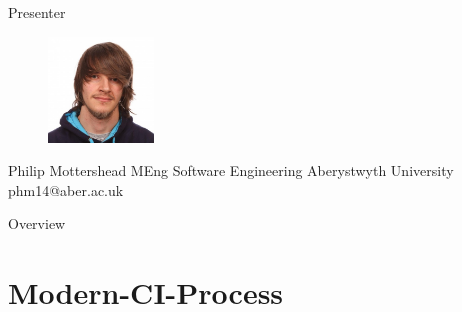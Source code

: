 \documentclass[aspectratio=169,xcolor=dvipsnames]{beamer}
\begin{document}
\begin{frame}{Presenter}
    \begin{figure}
        \centering
        \includegraphics[width=0.25\textwidth]{images/index.jpg}
        \label{fig:my_label}
    \end{figure}
    \centering Philip Mottershead\linebreak
    \centering MEng Software Engineering\linebreak
    \centering Aberystwyth University \linebreak
    \centering phm14@aber.ac.uk\linebreak
\end{frame}


\begin{frame}{Overview}
    \tableofcontents
\end{frame}

\section{Modern-CI-Process}
\end{document}
